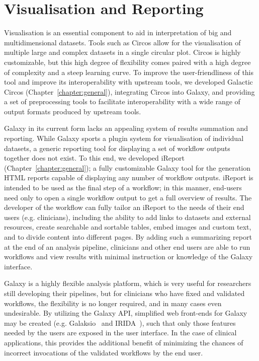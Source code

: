 \section{Visualisation and Reporting}
Visualisation is an essential component to aid in interpretation of big and multidimensional datasets. Tools such as Circos \cite{circos} allow for the visualisation of multiple large and complex datasets in a single circular plot. Circos is highly customizable, but this high degree of flexibility comes paired with a high degree of complexity and a steep learning curve. To improve the user-friendliness of this tool and improve its interoperability with upstream tools, we developed Galactic Circos (Chapter~\ref{chapter:general}), integrating Circos into Galaxy, and providing a set of preprocessing tools to facilitate interoperability with a wide range of output formats produced by upstream tools.

Galaxy in its current form lacks an appealing system of results summation and reporting. While Galaxy sports a plugin system for visualisation of individual datasets, a generic reporting tool for displaying a set of workflow outputs together does not exist. To this end, we developed iReport (Chapter~\ref{chapter:general}); a fully customizable Galaxy tool for the generation HTML reports capable of displaying any number of workflow outputs.
iReport is intended to be used as the final step of a workflow; in this manner, end-users need only to open a single workflow output to get a full overview of results. The developer of the workflow can fully tailor an iReport to the needs of their end users (e.g. clinicians), including the ability to add links to datasets and external resources, create searchable and sortable tables, embed images and custom text, and to divide content into different pages.
By adding such a summarizing report at the end of an analysis pipeline, clinicians and other end users are able to run workflows and view results with minimal instruction or knowledge of the Galaxy interface.

Galaxy is a highly flexible analysis platform, which is very useful for researchers still developing their pipelines, but for clinicians who have fixed and validated workflows, the flexibility is no longer required, and in many cases even undesirable. By utilizing the Galaxy API, simplified web front-ends for Galaxy may be created (e.g. Galaksio~\cite{klingstrom2017galaksio} and IRIDA~\cite{matthews2018integrated}), such that only those features needed by the users are exposed in the user interface. In the case of clinical applications, this provides the additional benefit of minimizing the chances of incorrect invocations of the validated workflows by the end user.

